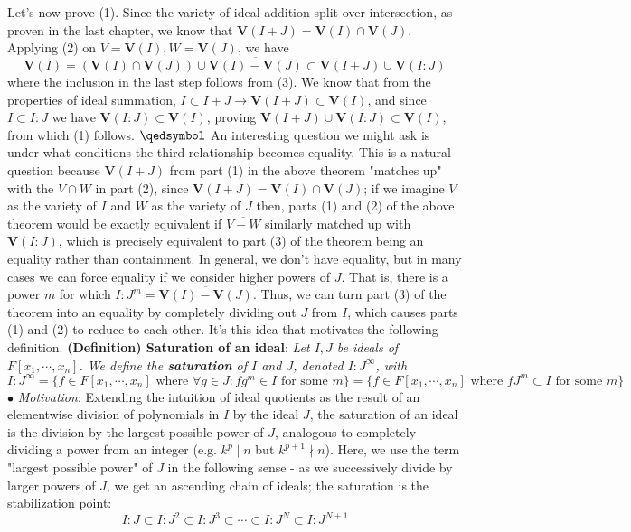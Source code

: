\documentclass{article}
\newcommand*{\tb}{\textbf}
\newcommand*{\ti}{\textit}
\newcommand*{\n}{\newline}
\newcommand*{\nn}{\newline \newline}
\newcommand*{\Fx}{\ensuremath{F[x_1, \cdots, x_n]}}
\newcommand*{\V}{\ensuremath{\mathbf{V}}}
\begin{document}
\n
Let's now prove (1). Since the variety of ideal addition split over intersection, as proven in the last chapter, we know that $ \V(I + J) = \V(I) \cap \V(J) $. Applying (2) on $ V = \V(I), W = \V(J) $, we have 
$$ \V(I) = (\V(I) \cap \V(J)) \cup \overline{\V(I) - \V(J)} \subset \V(I + J) \cup \V(I : J) $$
where the inclusion in the last step follows from (3). We know that from the properties of ideal summation, $ I \subset I + J \rightarrow \V(I + J) \subset \V(I) $, and since $ I \subset I : J $ we have $ \V(I : J) \subset \V(I) $, proving $ \V(I + J) \cup \V(I : J) \subset \V(I) $, from which (1) follows. $ \qedsymbol $
\nn
An interesting question we might ask is under what conditions the third relationship becomes equality. This is a natural question because $ \V(I + J) $ from part (1) in the above theorem "matches up" with the $ V \cap W $ in part (2), since $ \V(I + J) = \V(I) \cap \V(J) $; if we imagine $ V $ as the variety of $ I $ and $ W $ as the variety of $ J $ then, parts (1) and (2) of the above theorem would be exactly equivalent if $ \overline{V - W} $ similarly matched up with $ \V(I : J) $, which is precisely equivalent to part (3) of the theorem being an equality rather than containment. In general, we don't have equality, but in many cases we can force equality if we consider higher powers of $ J $. That is, there is a power $ m $ for which $ I : J^m = \overline{\V(I) - \V(J)} $.
\n
Thus, we can turn part (3) of the theorem into an equality by completely dividing out $ J $ from $ I $, which causes parts (1) and (2) to reduce to each other. It's this idea that motivates the following definition.
\nn
\tb{(Definition) Saturation of an ideal}: \ti{Let $ I, J $ be ideals of $ \Fx $. We define the \tb{saturation} of $ I $ and $ J $, denoted $ I : J^\infty $, with}
$$ I : J^\infty = \{ f \in \Fx \text{ where  } \forall g \in J: f g^m \in I \text{ for some  } m \} = \{ f \in \Fx \text{ where  } f J^m \subset I \text{ for some  } m \} $$
\indent $ \bullet $ \ti{Motivation}: Extending the intuition of ideal quotients as the result of an elementwise division of polynomials in $ I $ by the ideal $ J $, the saturation of an ideal is the division by the largest possible power of $ J $, analogous to completely dividing a power from an integer (e.g. $ k^p \mid n $ but $ k^{p + 1} \nmid n $). Here, we use the term "largest possible power" of $ J $ in the following sense - as we successively divide by larger powers of $ J $, we get an ascending chain of ideals; the saturation is the stabilization point:
$$ I : J \subset I : J^2 \subset I : J^3 \subset \cdots \subset I : J^N \subset I : J^{N + 1} $$
\end{document}
